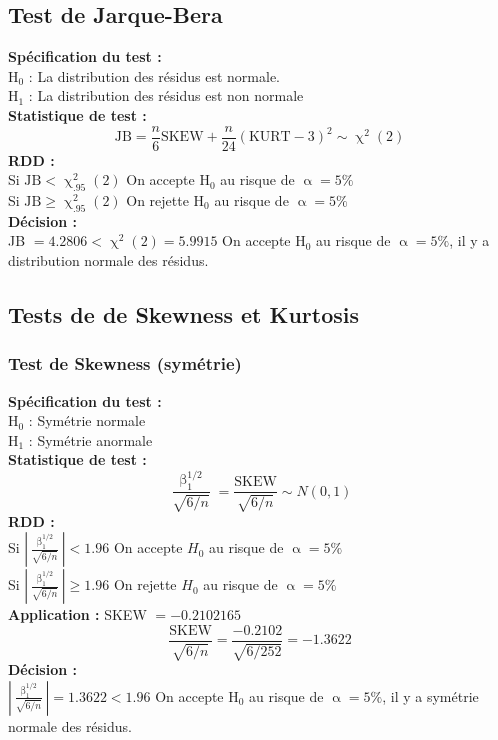 \documentclass[A4paper]{article}
\begin{document}
\subsection{Test de Jarque-Bera}
\textbf{Spécification du test :}\\
H$_0$ : La distribution des résidus est normale. \\
H$_1$ : La distribution des résidus est non normale\\
\textbf{Statistique de test :}
\begin{equation*}
	\text{JB} = \frac{n}{6} \text{SKEW} + \frac{n}{24} (\text{KURT} -3)^2 \sim \upchi^2(2)		
\end{equation*}
\textbf{RDD :} \\
Si  $\text{JB} < \upchi^2_{.95}(2)$  On accepte  H$_0$  au risque de  $\upalpha = 5\%$ \\
Si  $\text{JB} \ge  \upchi^2_{.95}(2)$  On rejette  H$_0$  au risque de  $\upalpha = 5\%$  \\
\textbf{Décision :} \\
JB $= 4.2806 < \upchi^2(2) = 5.9915$ On accepte H$_0$ au risque de $\upalpha = 5\%$, il y a distribution normale des résidus.
\subsection{Tests de de Skewness et Kurtosis}
\subsubsection{Test de Skewness (symétrie)}
\textbf{Spécification du test :} \\
H$_0$ : Symétrie normale \\
H$_1$ : Symétrie anormale \\
\textbf{Statistique de test :}
\begin{equation*}
		\frac{\upbeta_1^{1/2}}{\sqrt{6/n}}=  \frac{\text{SKEW}}{\sqrt{6/n}} \sim N(0,1)
\end{equation*}
\textbf{RDD :} \\
Si $\left| \frac{\upbeta^{1/2}_1}{\sqrt{6/n}} \right|  < 1.96$ On accepte $H_0$ au risque de $\upalpha = 5\% $\\
Si $\left| \frac{\upbeta^{1/2}_1}{\sqrt{6/n}} \right|  \geq 1.96$ On rejette $H_0$ au risque de $\upalpha = 5\%$ \\
\textbf{Application :} SKEW $= -0.2102165$
\begin{equation*}
	\frac{\text{SKEW}}{\sqrt{6/n}} = \frac{-0.2102}{\sqrt{6/252}} = -1.3622
\end{equation*}
\textbf{Décision :}\\
$\left| \frac{\upbeta^{1/2}_1}{\sqrt{6/n}} \right| = 1.3622 < 1.96 $ On accepte H$_0$ au risque de  $\upalpha=5\%$, il y a symétrie normale des résidus.
\newpage
\end{document}
